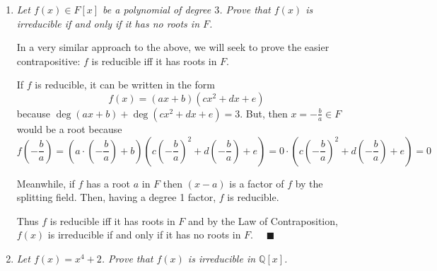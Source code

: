 \documentclass[12pt]{article}
\newcommand{\qed}{\quad \blacksquare}
\newcommand{\Q}{\mathbb{Q}}
\begin{document}
\begin{enumerate}[label=(\alph*)]
            \color{black}

        \item \emph{Let $f(x) \in F[x]$ be a polynomial of degree $3$. Prove that $f(x)$ is irreducible if and only if it has no roots in $F$.}
        
            \color{blue}
                In a very similar approach to the above, we will seek to prove the easier contrapositive: $f$ is reducible iff it has roots in $F$. 

                If $f$ is reducible, it can be written in the form 
                \[f(x) = (ax + b)(cx^2 +dx + e)\] 
                because $\deg(ax + b) + \deg(cx^2  +dx + e) = 3$. But, then $x = -\frac{b}{a} \in F$ would be a root because 
                \[f(-\frac{b}{a}) = (a\cdot (-\frac{b}{a}) + b)(c(-\frac{b}{a})^2 +d(-\frac{b}{a}) + e) = 0 \cdot (c(-\frac{b}{a})^2 +d(-\frac{b}{a}) + e) = 0\]

                Meanwhile, if $f$ has a root $a$ in $F$ then $(x - a)$ is a factor of $f$ by the splitting field. Then, having a degree 1 factor, $f$ is reducible. 

                Thus $f$ is reducible iff it has roots in $F$ and by the Law of Contraposition, $f(x)$ is irreducible if and only if it has no roots in $F$. $\qed$
            \color{black}

        
        \item \emph{Let $f(x) = x^4 + 2$. Prove that $f(x)$ is irreducible in $\Q[x]$.}
        

\end{enumerate}
\end{document}

